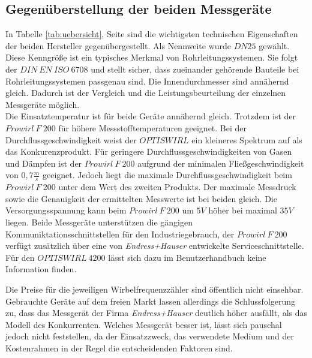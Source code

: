 \subsection{Gegenüberstellung der beiden Messgeräte}
In Tabelle \ref{tab:uebersicht}, Seite \pageref{tab:uebersicht} sind die wichtigsten technischen Eigenschaften der beiden Hersteller gegenübergestellt. Als Nennweite wurde $DN25$  gewählt. Diese Kenngröße ist ein typisches Merkmal von Rohrleitungssystemen. Sie folgt der $DIN \: EN \: ISO \: 6708$ und stellt sicher, dass zueinander gehörende Bauteile bei Rohrleitungssystemen passgenau sind. Die Innendurchmesser sind annähernd gleich. Dadurch ist der Vergleich und die Leistungsbeurteilung der einzelnen Messgeräte möglich.\autocite[vgl.][399]{technischesZeichnen}\\
Die Einsatztemperatur ist für beide Geräte annähernd gleich. Trotzdem ist der $Prowirl \: F \: 200$ für höhere Messstofftemperaturen geeignet. Bei der Durchflussgeschwindigkeit weist der $OPTISWIRL$ ein kleineres Spektrum auf als das Konkurenzprodukt. Für geringere Durchflussgeschwindigkeiten von Gasen und Dämpfen ist der $Prowirl \: F \: 200$ aufgrund der minimalen Fließgeschwindigkeit von $0,7 \frac{m}{s}$ geeignet. Jedoch liegt die maximale Durchflussgeschwindigkeit beim $Prowirl \: F \: 200$ unter dem Wert des zweiten Produkts. Der maximale Messdruck sowie die Genauigkeit der ermittelten Messwerte ist bei beiden gleich. Die Versorgungsspannung kann beim $Prowirl \: F \: 200$ um $5V$ höher bei maximal $35V$ liegen. Beide Messgeräte unterstützen die gängigen Kommuniktationsschnittstellen für den Industriegebrauch, der $Prowirl \: F \: 200$ verfügt zusätzlich über eine von \textit{Endress+Hauser} entwickelte Serviceschnittstelle. Für den $OPTISWIRL \: 4200$ lässt sich dazu im Benutzerhandbuch keine Information finden.\autocites[vgl.][9 \psqq]{Prowirl}[vgl.][108 \psqq]{Optiswirl}

Die Preise für die jeweiligen Wirbelfrequenzzähler sind öffentlich nicht einsehbar. Gebrauchte Geräte auf dem freien Markt lassen allerdings die Schlussfolgerung zu, dass das Messgerät der Firma \textit{Endress+Hauser} deutlich höher ausfällt, als das Modell des Konkurrenten. Welches Messgerät besser ist, lässt sich pauschal jedoch nicht feststellen, da der Einsatzzweck, das verwendete Medium und der Kostenrahmen in der Regel die entscheidenden Faktoren sind.\autocites[vgl.][]{KostenOptiswirl}[vgl.][]{KostenProwirl}
